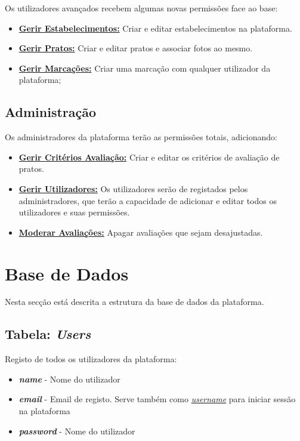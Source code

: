 \documentclass[11pt, a4paper, sans]{article}
\begin{document}
	Os utilizadores avançados recebem algumas novas permissões face ao base:

	\begin{itemize}
		\item \underline{\textbf{Gerir Estabelecimentos:}} Criar e editar estabelecimentos na plataforma.
		\item \underline{\textbf{Gerir Pratos:}} Criar e editar pratos e associar fotos ao mesmo.
		\item \underline{\textbf{Gerir Marcações:}} Criar uma marcação com qualquer utilizador da plataforma;
	\end{itemize}

	\subsection{Administração}
	Os administradores da plataforma terão as permissões totais, adicionando:
	\begin{itemize}
		\item \underline{\textbf{Gerir Critérios Avaliação:}} Criar e editar os critérios de avaliação de pratos.
		\item \underline{\textbf{Gerir Utilizadores:}} Os utilizadores serão de registados pelos administradores,
			que terão a capacidade de adicionar e editar todos os utilizadores e suas permissões.
		\item \underline{\textbf{Moderar Avaliações:}} Apagar avaliações que sejam desajustadas.
	\end{itemize}

	\section{Base de Dados}

	Nesta secção está descrita a estrutura da base de dados da plataforma.

	\subsection{Tabela: \textit{Users}} \label{db-table-users}

	Registo de todos os utilizadores da plataforma:

	\begin{itemize}
		\item \textbf{\textit{name}} - Nome do utilizador
		\item \textbf{\textit{email}} - Email de registo. Serve também como \underline{\textit{username}} para 
			iniciar sessão na plataforma
		\item \textbf{\textit{password}} - Nome do utilizador
	\end{itemize}
\end{document}
